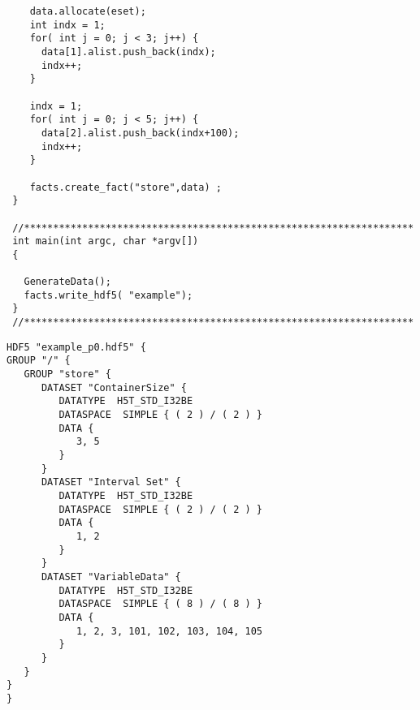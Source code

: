 \begin{verbatim}
    data.allocate(eset);
    int indx = 1;
    for( int j = 0; j < 3; j++) {
      data[1].alist.push_back(indx);
      indx++;
    }

    indx = 1;
    for( int j = 0; j < 5; j++) {
      data[2].alist.push_back(indx+100);
      indx++;
    }

    facts.create_fact("store",data) ;
 }
    
 //*******************************************************************
 int main(int argc, char *argv[])
 {
   
   GenerateData();
   facts.write_hdf5( "example");
 }
 //*******************************************************************
\end{verbatim}
\begin{verbatim}
HDF5 "example_p0.hdf5" {
GROUP "/" {
   GROUP "store" {
      DATASET "ContainerSize" {
         DATATYPE  H5T_STD_I32BE  
         DATASPACE  SIMPLE { ( 2 ) / ( 2 ) } 
         DATA {
            3, 5
         } 
      } 
      DATASET "Interval Set" {
         DATATYPE  H5T_STD_I32BE  
         DATASPACE  SIMPLE { ( 2 ) / ( 2 ) } 
         DATA {
            1, 2
         } 
      } 
      DATASET "VariableData" {
         DATATYPE  H5T_STD_I32BE  
         DATASPACE  SIMPLE { ( 8 ) / ( 8 ) } 
         DATA {
            1, 2, 3, 101, 102, 103, 104, 105
         } 
      } 
   } 
} 
} 
\end{verbatim}
